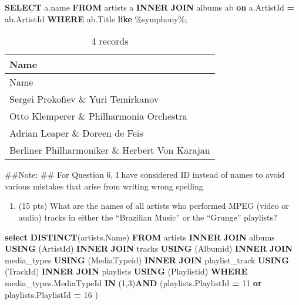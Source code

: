\documentclass[
]{article}
\newenvironment{Shaded}{\begin{snugshade}}{\end{snugshade}}
\newcommand{\DecValTok}[1]{\textcolor[rgb]{0.00,0.00,0.81}{#1}}
\newcommand{\KeywordTok}[1]{\textcolor[rgb]{0.13,0.29,0.53}{\textbf{#1}}}
\newcommand{\NormalTok}[1]{#1}
\newcommand{\OperatorTok}[1]{\textcolor[rgb]{0.81,0.36,0.00}{\textbf{#1}}}
\newcommand{\StringTok}[1]{\textcolor[rgb]{0.31,0.60,0.02}{#1}}
\providecommand{\tightlist}{%
  \setlength{\itemsep}{0pt}\setlength{\parskip}{0pt}}
\begin{document}
\begin{Shaded}
\begin{Highlighting}[]

\KeywordTok{SELECT}\NormalTok{ a.name}
\KeywordTok{FROM}\NormalTok{ artists a }\KeywordTok{INNER} \KeywordTok{JOIN}\NormalTok{ albums ab }\KeywordTok{on} 
\NormalTok{a.ArtistId }\OperatorTok{=}\NormalTok{ ab.ArtistId}
\KeywordTok{WHERE}\NormalTok{ ab.Title }\KeywordTok{like} \StringTok{\textquotesingle{}\%symphony\%\textquotesingle{}}\NormalTok{;}
\end{Highlighting}
\end{Shaded}

\begin{longtable}[]{@{}l@{}}
\caption{4 records}\tabularnewline
\toprule
Name \\
\midrule
\endfirsthead
\toprule
Name \\
\midrule
\endhead
Sergei Prokofiev \& Yuri Temirkanov \\
Otto Klemperer \& Philharmonia Orchestra \\
Adrian Leaper \& Doreen de Feis \\
Berliner Philharmoniker \& Herbert Von Karajan \\
\bottomrule
\end{longtable}

\#\#Note: \#\# For Question 6, I have considered ID instead of names to
avoid various mistakes that arise from writing wrong spelling

\begin{enumerate}
\def\labelenumi{\arabic{enumi}.}
\setcounter{enumi}{5}
\tightlist
\item
  (15 pts) What are the names of all artists who performed MPEG (video
  or audio) tracks in either the ``Brazilian Music'' or the ``Grunge''
  playlists?
\end{enumerate}

\begin{Shaded}
\begin{Highlighting}[]

\KeywordTok{select} \KeywordTok{DISTINCT}\NormalTok{(artists.Name)}
\KeywordTok{FROM}\NormalTok{ artists }\KeywordTok{INNER} \KeywordTok{JOIN}\NormalTok{ albums }\KeywordTok{USING}\NormalTok{ (ArtistId)}
\KeywordTok{INNER} \KeywordTok{JOIN}\NormalTok{ tracks }\KeywordTok{USING}\NormalTok{ (Albumid)}
\KeywordTok{INNER} \KeywordTok{JOIN}\NormalTok{ media\_types }\KeywordTok{USING}\NormalTok{ (MediaTypeid)}
\KeywordTok{INNER} \KeywordTok{JOIN}\NormalTok{ playlist\_track }\KeywordTok{USING}\NormalTok{ (TrackId)}
\KeywordTok{INNER} \KeywordTok{JOIN}\NormalTok{ playlists }\KeywordTok{USING}\NormalTok{ (Playlistid)}
\KeywordTok{WHERE}\NormalTok{ media\_types.MediaTypeId }\KeywordTok{IN}\NormalTok{ (}\DecValTok{1}\NormalTok{,}\DecValTok{3}\NormalTok{)}\KeywordTok{AND}\NormalTok{ (playlists.PlaylistId }\OperatorTok{=} \DecValTok{11} \KeywordTok{or}\NormalTok{ playlists.PlaylistId }\OperatorTok{=} \DecValTok{16}\NormalTok{ )}
\end{Highlighting}
\end{Shaded}
\end{document}

